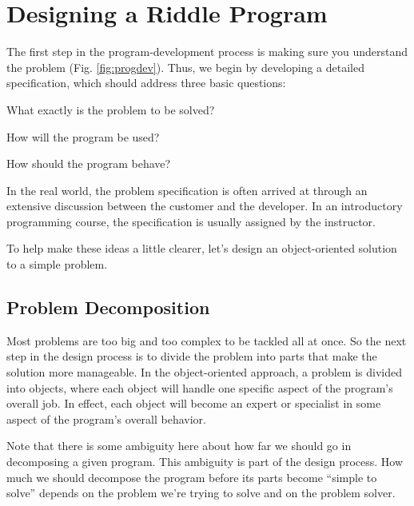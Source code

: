 \section{Designing a Riddle Program}

The first step in the program-development process is making sure you
understand the problem (Fig. \ref{fig:progdev}).  Thus, we begin by
developing a detailed specification, which should address three basic
questions:

\begin{BL}
\item  What exactly is the problem to be solved?
\item  How will the program be used?
\item  How should the program behave?
\end{BL}

\noindent In the real world, the problem specification is often
arrived at through an extensive discussion between the customer and
the developer.  In an introductory programming course, the
specification is usually assigned by the instructor.

To help make these ideas a little clearer, let's design an
object-oriented solution to a simple problem.


\subsection{Problem Decomposition}

\noindent Most problems are too big and too complex to be tackled
all at once. So the next step in the design process is to divide the
problem into parts that make the solution more manageable.  In the
object-oriented approach, a problem is divided into objects, where
each object will handle one specific aspect of the program's overall
job. In effect, each object will become an expert or specialist in
some aspect of the program's overall behavior.

Note that there is some ambiguity here about how far we should go in
decomposing a given program.  This ambiguity is part of the design
process.  How much we should decompose the program before its parts
become ``simple to solve'' depends on the problem we're trying to
solve and on the problem solver.

